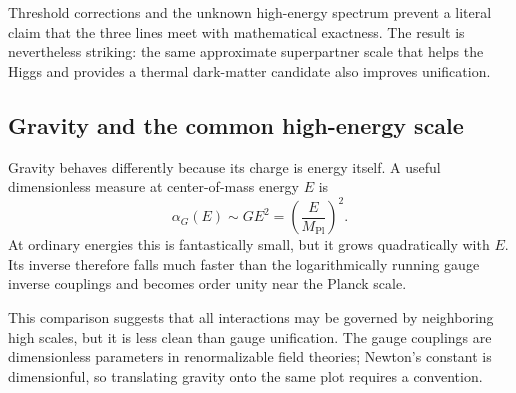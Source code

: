 \begin{classroomqa}
\end{classroomqa}

Threshold corrections and the unknown high-energy spectrum prevent a literal claim that the three lines meet with mathematical exactness. The result is nevertheless striking: the same approximate superpartner scale that helps the Higgs and provides a thermal dark-matter candidate also improves unification.

\subsection{Gravity and the common high-energy scale}

Gravity behaves differently because its charge is energy itself. A useful dimensionless measure at center-of-mass energy \(E\) is
\begin{equation}
\alpha_G(E)\sim GE^2
=\left(\frac{E}{M_{\mathrm{Pl}}}\right)^2.
\end{equation}
At ordinary energies this is fantastically small, but it grows quadratically with \(E\). Its inverse therefore falls much faster than the logarithmically running gauge inverse couplings and becomes order unity near the Planck scale.

This comparison suggests that all interactions may be governed by neighboring high scales, but it is less clean than gauge unification. The gauge couplings are dimensionless parameters in renormalizable field theories; Newton's constant is dimensionful, so translating gravity onto the same plot requires a convention.

\begin{classroomqa}
\end{classroomqa}

